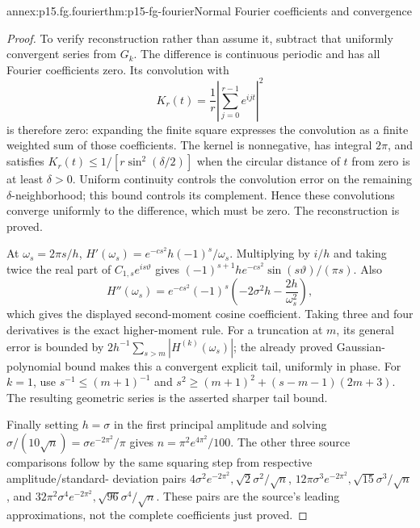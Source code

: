 \begin{annexitem}{annex:p15.fg.fourier}{thm:p15-fg-fourier}{Normal Fourier coefficients and convergence}
\begin{proof}
To verify reconstruction rather than assume it, subtract that uniformly
convergent series from \(G_k\). The difference is continuous periodic
and has all Fourier coefficients zero. Its convolution with
\[
 K_r(t)=\frac1r\left|\sum_{j=0}^{r-1}e^{ijt}\right|^2
\]
is therefore zero: expanding the finite square expresses the convolution
as a finite weighted sum of those coefficients. The kernel is nonnegative,
has integral \(2\pi\), and satisfies
\(K_r(t)\leq1/[r\sin^2(\delta/2)]\) when the circular distance of
\(t\) from zero is at least \(\delta>0\). Uniform continuity controls
the convolution error on the remaining \(\delta\)-neighborhood; this
bound controls its complement. Hence these convolutions converge uniformly
to the difference, which must be zero. The reconstruction is proved.

At \(\omega_s=2\pi s/h\),
\(H'(\omega_s)=e^{-cs^2}h(-1)^s/\omega_s\).
Multiplying by \(i/h\) and taking twice the real part of
\(C_{1,s}e^{is\vartheta}\) gives
\((-1)^{s+1}h e^{-cs^2}\sin(s\vartheta)/(\pi s)\).
Also
\[
 H''(\omega_s)=e^{-cs^2}(-1)^s
       \left(-2\sigma^2h-\frac{2h}{\omega_s^2}\right),
\]
which gives the displayed second-moment cosine coefficient. Taking three
and four derivatives is the exact higher-moment rule. For a truncation at
\(m\), its general error is bounded by
\(2h^{-1}\sum_{s>m}|H^{(k)}(\omega_s)|\); the already proved
Gaussian-polynomial bound makes this a convergent explicit tail, uniformly
in phase. For \(k=1\), use \(s^{-1}\leq(m+1)^{-1}\) and
\(s^2\geq(m+1)^2+(s-m-1)(2m+3)\). The resulting geometric series
is the asserted sharper tail bound.

Finally setting \(h=\sigma\) in the first principal amplitude and
solving \(\sigma/(10\sqrt n)=\sigma e^{-2\pi^2}/\pi\)
gives \(n=\pi^2e^{4\pi^2}/100\). The other three source comparisons
follow by the same squaring step from respective amplitude/standard-
deviation pairs
\(4\sigma^2e^{-2\pi^2},\sqrt2\sigma^2/\sqrt n\),
\(12\pi\sigma^3e^{-2\pi^2},\sqrt{15}\sigma^3/\sqrt n\), and
\(32\pi^2\sigma^4e^{-2\pi^2},\sqrt{96}\sigma^4/\sqrt n\).
These pairs are the source's leading approximations, not the complete
coefficients just proved.
\end{proof}
\end{annexitem}

